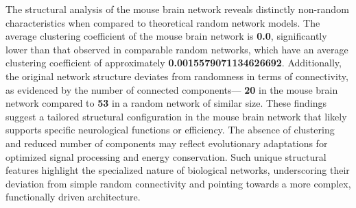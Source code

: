 \documentclass[
	report, %
	11pt, %
]{CSUniSchoolLabReport}
\begin{document}
	The structural analysis of the mouse brain network reveals distinctly non-random characteristics when compared to theoretical random network models. The average clustering coefficient of the mouse brain network is \textbf{0.0}, significantly lower than that observed in comparable random networks, which have an average clustering coefficient of approximately \textbf{\num{0.0015579071134626692}}. Additionally, the original network structure deviates from randomness in terms of connectivity, as evidenced by the number of connected components— \textbf{20} in the mouse brain network compared to \textbf{53} in a random network of similar size. These findings suggest a tailored structural configuration in the mouse brain network that likely supports specific neurological functions or efficiency. The absence of clustering and reduced number of components may reflect evolutionary adaptations for optimized signal processing and energy conservation. Such unique structural features highlight the specialized nature of biological networks, underscoring their deviation from simple random connectivity and pointing towards a more complex, functionally driven architecture.
\end{document}
